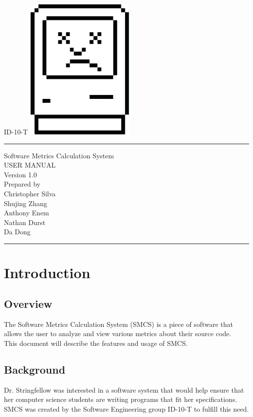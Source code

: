 \documentclass{scrreprt}
\author{Christopher Silva}
\date{}
\def\myversion{1.0 }
\begin{document}
	\begin{titlepage}
		\flushright
		\LARGE{ID-10-T}
		\includegraphics[scale=0.08]{logo.png}
		\rule{16cm}{5pt}\vskip1cm
		\centering
		\Huge{Software Metrics Calculation System}\\
		\vspace{2cm}
		\Huge{USER MANUAL}\\
		\vspace{2cm}
		\LARGE{Version \myversion\\}
		\vspace{2cm}
		Prepared by\\
	    Christopher Silva\\
	    Shujing Zhang\\
		Anthony Enem\\
		Nathan Durst\\
		Da Dong\\
		\vfill
		\rule{16cm}{5pt}
	\end{titlepage}
	\tableofcontents
	\chapter{Introduction}
	
	\section{Overview}
	The Software Metrics Calculation System (SMCS) is a piece of software that allows the user to analyze and view various metrics about their source code. \\
	This document will describe the features and usage of SMCS.
	
	\section{Background}
	Dr. Stringfellow was interested in a software system that would help ensure that her computer science students are writing programs that fit her specifications.
	SMCS was created by the Software Engineering group ID-10-T to fulfill this need.
	
\end{document}
